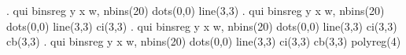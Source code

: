 . qui binsreg y x w, nbins(20) dots(0,0) line(3,3)
{\smallskip}
. qui binsreg y x w, nbins(20) dots(0,0) line(3,3) ci(3,3)
{\smallskip}
. qui binsreg y x w, nbins(20) dots(0,0) line(3,3) ci(3,3) cb(3,3)
{\smallskip}
. qui binsreg y x w, nbins(20) dots(0,0) line(3,3) ci(3,3) cb(3,3) polyreg(4)
{\smallskip}
